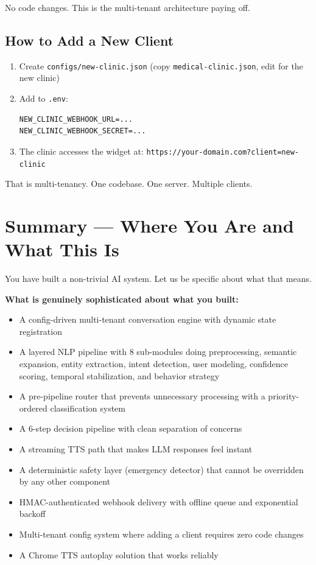 \documentclass[12pt, a4paper]{report}
\newcommand{\ic}[1]{\texttt{\small\color{accentblue!70!black}#1}}
\begin{document}
No code changes. This is the multi-tenant architecture paying off.

\section{How to Add a New Client}

\begin{enumerate}
  \item Create \ic{configs/new-clinic.json} (copy \ic{medical-clinic.json}, edit for the
        new clinic)
  \item Add to \ic{.env}:
        \begin{lstlisting}
NEW_CLINIC_WEBHOOK_URL=...
NEW_CLINIC_WEBHOOK_SECRET=...
        \end{lstlisting}
  \item The clinic accesses the widget at:
        \ic{https://your-domain.com?client=new-clinic}
\end{enumerate}

That is multi-tenancy. One codebase. One server. Multiple clients.

\chapter*{Summary --- Where You Are and What This Is}

You have built a non-trivial AI system. Let us be specific about what that means.

\textbf{What is genuinely sophisticated about what you built:}
\begin{itemize}
  \item A config-driven multi-tenant conversation engine with dynamic state registration
  \item A layered NLP pipeline with 8 sub-modules doing preprocessing, semantic
        expansion, entity extraction, intent detection, user modeling, confidence scoring,
        temporal stabilization, and behavior strategy
  \item A pre-pipeline router that prevents unnecessary processing with a
        priority-ordered classification system
  \item A 6-step decision pipeline with clean separation of concerns
  \item A streaming TTS path that makes LLM responses feel instant
  \item A deterministic safety layer (emergency detector) that cannot be overridden by
        any other component
  \item HMAC-authenticated webhook delivery with offline queue and exponential backoff
  \item Multi-tenant config system where adding a client requires zero code changes
  \item A Chrome TTS autoplay solution that works reliably
\end{itemize}
\end{document}
